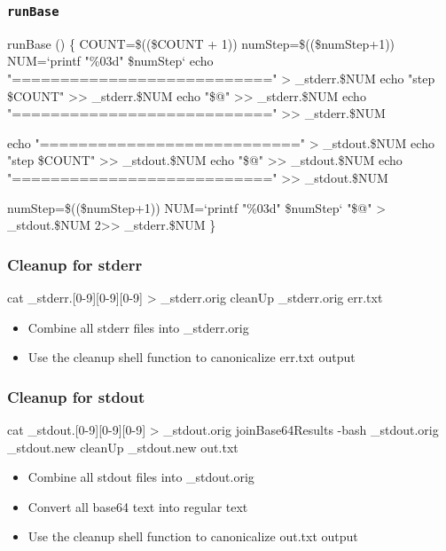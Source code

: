 \documentclass{beamer}
\begin{document}
\begin{frame}[fragile]
  \frametitle{\texttt{runBase}}
    {\tiny
\begin{semiverbatim}
runBase ()
\{
   COUNT=\$((\$COUNT + 1))
   numStep=\$((\$numStep+1)) 
   NUM=`printf "\%03d" \$numStep`
   echo "===========================" >  \_stderr.\$NUM
   echo "step \$COUNT"                 >> \_stderr.\$NUM
   echo "\$@"                          >> \_stderr.\$NUM
   echo "===========================" >> \_stderr.\$NUM

   echo "===========================" >  \_stdout.\$NUM
   echo "step \$COUNT"                 >> \_stdout.\$NUM
   echo "\$@"                          >> \_stdout.\$NUM
   echo "===========================" >> \_stdout.\$NUM

   numStep=\$((\$numStep+1))
   NUM=`printf "\%03d" \$numStep`
   "\$@" > \_stdout.\$NUM 2>> \_stderr.\$NUM
\}
\end{semiverbatim}
    }
\end{frame}


\begin{frame}[fragile]
  \frametitle{Cleanup for stderr}
    {\tiny
\begin{semiverbatim}
     cat \_stderr.[0-9][0-9][0-9] > \_stderr.orig
     cleanUp \_stderr.orig err.txt
\end{semiverbatim}
    }
    \begin{itemize}
      \item Combine all stderr files into \_stderr.orig
      \item Use the cleanup shell function to canonicalize err.txt output
    \end{itemize}
\end{frame}

\begin{frame}[fragile]
  \frametitle{Cleanup for stdout}
    {\tiny
\begin{semiverbatim}
     cat \_stdout.[0-9][0-9][0-9] > \_stdout.orig
     joinBase64Results  -bash  \_stdout.orig \_stdout.new
     cleanUp \_stdout.new out.txt
\end{semiverbatim}
    }
    \begin{itemize}
      \item Combine all stdout files into \_stdout.orig
      \item Convert all base64 text into regular text
      \item Use the cleanup shell function to canonicalize out.txt output
    \end{itemize}
\end{frame}
\end{document}
